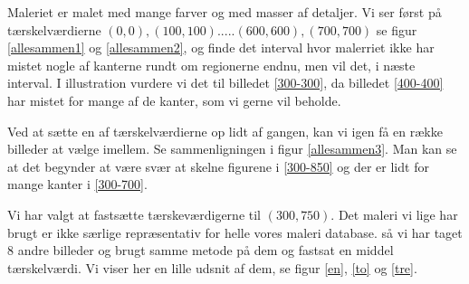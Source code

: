 Maleriet er malet med mange farver og med masser af detaljer. Vi ser
først på tærskelværdierne $(0,0),(100,100).....(600,600),(700,700)$ se
figur \ref{allesammen1} og \ref{allesammen2}, og finde det interval hvor
malerriet ikke har mistet nogle af kanterne rundt om regionerne endnu,
men vil det, i næste interval. I illustration vurdere vi det til
billedet \ref{300-300}, da billedet \ref{400-400} har mistet for mange
af de kanter, som vi gerne vil beholde.

Ved at sætte en af tærskelværdierne op lidt af gangen, kan vi igen få en
række billeder at vælge imellem. Se sammenligningen i figur
\ref{allesammen3}. Man kan se at det begynder at være svær at skelne
figurene i \ref{300-850} og der er lidt for mange kanter i
\ref{300-700}.

Vi har valgt at fastsætte tærskeværdigerne til $(300,750)$. Det maleri
vi lige har brugt er ikke særlige repræsentativ for helle vores maleri
database. så vi har taget 8 andre billeder og brugt samme metode på dem og fastsat en
middel tærskelværdi. Vi viser her en lille udsnit af dem, se figur
\ref{en}, \ref{to} og \ref{tre}.
\clearpage
